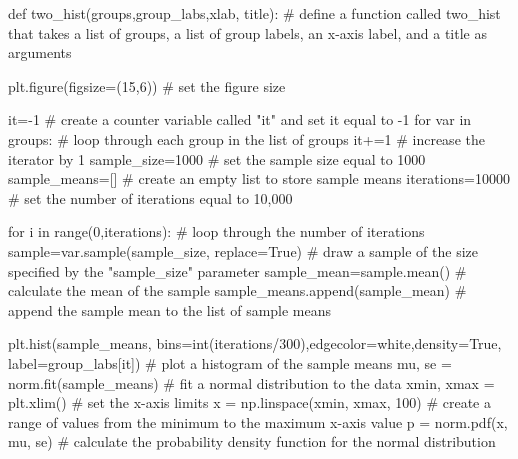 \documentclass[
  letterpaper,
  DIV=11,
  numbers=noendperiod]{scrreprt}
\newenvironment{Shaded}{\begin{snugshade}}{\end{snugshade}}
\newcommand{\BuiltInTok}[1]{\textcolor[rgb]{0.00,0.23,0.31}{#1}}
\newcommand{\CommentTok}[1]{\textcolor[rgb]{0.37,0.37,0.37}{#1}}
\newcommand{\ControlFlowTok}[1]{\textcolor[rgb]{0.00,0.23,0.31}{#1}}
\newcommand{\DecValTok}[1]{\textcolor[rgb]{0.68,0.00,0.00}{#1}}
\newcommand{\KeywordTok}[1]{\textcolor[rgb]{0.00,0.23,0.31}{#1}}
\newcommand{\NormalTok}[1]{\textcolor[rgb]{0.00,0.23,0.31}{#1}}
\newcommand{\OperatorTok}[1]{\textcolor[rgb]{0.37,0.37,0.37}{#1}}
\newcommand{\StringTok}[1]{\textcolor[rgb]{0.13,0.47,0.30}{#1}}
\newcommand{\VariableTok}[1]{\textcolor[rgb]{0.07,0.07,0.07}{#1}}
\begin{document}
\begin{Shaded}
\begin{Highlighting}[]
\KeywordTok{def}\NormalTok{ two\_hist(groups,group\_labs,xlab, title): }\CommentTok{\# define a function called two\_hist that takes a list of groups, a list of group labels, an x{-}axis label, and a title as arguments}

\NormalTok{        plt.figure(figsize}\OperatorTok{=}\NormalTok{(}\DecValTok{15}\NormalTok{,}\DecValTok{6}\NormalTok{)) }\CommentTok{\# set the figure size}

\NormalTok{        it}\OperatorTok{={-}}\DecValTok{1} \CommentTok{\# create a counter variable called "it" and set it equal to {-}1}
        \ControlFlowTok{for}\NormalTok{ var }\KeywordTok{in}\NormalTok{ groups: }\CommentTok{\# loop through each group in the list of groups}
\NormalTok{            it}\OperatorTok{+=}\DecValTok{1} \CommentTok{\# increase the iterator by 1}
\NormalTok{            sample\_size}\OperatorTok{=}\DecValTok{1000} \CommentTok{\# set the sample size equal to 1000}
\NormalTok{            sample\_means}\OperatorTok{=}\NormalTok{[] }\CommentTok{\# create an empty list to store sample means}
\NormalTok{            iterations}\OperatorTok{=}\DecValTok{10000} \CommentTok{\# set the number of iterations equal to 10,000}

            \ControlFlowTok{for}\NormalTok{ i }\KeywordTok{in} \BuiltInTok{range}\NormalTok{(}\DecValTok{0}\NormalTok{,iterations): }\CommentTok{\# loop through the number of iterations}
\NormalTok{                sample}\OperatorTok{=}\NormalTok{var.sample(sample\_size, replace}\OperatorTok{=}\VariableTok{True}\NormalTok{) }\CommentTok{\# draw a sample of the size specified by the "sample\_size" parameter}
\NormalTok{                sample\_mean}\OperatorTok{=}\NormalTok{sample.mean() }\CommentTok{\# calculate the mean of the sample}
\NormalTok{                sample\_means.append(sample\_mean) }\CommentTok{\# append the sample mean to the list of sample means}
            
\NormalTok{            plt.hist(sample\_means, bins}\OperatorTok{=}\BuiltInTok{int}\NormalTok{(iterations}\OperatorTok{/}\DecValTok{300}\NormalTok{),edgecolor}\OperatorTok{=}\StringTok{\textquotesingle{}white\textquotesingle{}}\NormalTok{,density}\OperatorTok{=}\VariableTok{True}\NormalTok{, label}\OperatorTok{=}\NormalTok{group\_labs[it])  }\CommentTok{\# plot a histogram of the sample means}
\NormalTok{            mu, se }\OperatorTok{=}\NormalTok{ norm.fit(sample\_means) }\CommentTok{\# fit a normal distribution to the data}
\NormalTok{            xmin, xmax }\OperatorTok{=}\NormalTok{ plt.xlim() }\CommentTok{\# set the x{-}axis limits}
\NormalTok{            x }\OperatorTok{=}\NormalTok{ np.linspace(xmin, xmax, }\DecValTok{100}\NormalTok{) }\CommentTok{\# create a range of values from the minimum to the maximum x{-}axis value}
\NormalTok{            p }\OperatorTok{=}\NormalTok{ norm.pdf(x, mu, se) }\CommentTok{\# calculate the probability density function for the normal distribution}


\end{Highlighting}
\end{Shaded}
\end{document}
